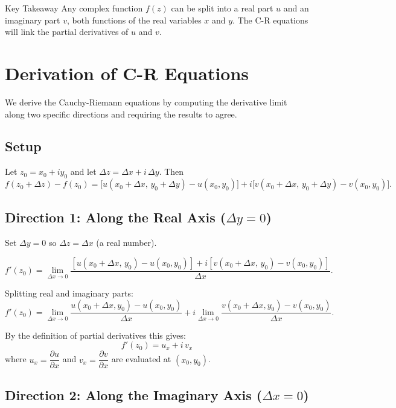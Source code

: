 \documentclass[12pt,a4paper]{article}
\begin{document}
\begin{learnbox}{Key Takeaway}
Any complex function $f(z)$ can be split into a real part $u$ and an imaginary part $v$, both functions of the real variables $x$ and $y$. The C-R equations will link the partial derivatives of $u$ and $v$.
\end{learnbox}

\section{Derivation of C-R Equations}

We derive the Cauchy-Riemann equations by computing the derivative limit along two specific directions and requiring the results to agree.

\subsection*{Setup}

Let $z_0 = x_0 + iy_0$ and let $\Delta z = \Delta x + i\,\Delta y$.
Then
\[
  f(z_0+\Delta z) - f(z_0)
  = \bigl[u(x_0+\Delta x,\,y_0+\Delta y) - u(x_0,y_0)\bigr]
  + i\bigl[v(x_0+\Delta x,\,y_0+\Delta y) - v(x_0,y_0)\bigr].
\]

\subsection*{Direction 1: Along the Real Axis ($\Delta y = 0$)}

Set $\Delta y = 0$ so $\Delta z = \Delta x$ (a real number).

\[
  f'(z_0) = \lim_{\Delta x \to 0}
  \frac{[u(x_0+\Delta x,\,y_0) - u(x_0,y_0)] + i[v(x_0+\Delta x,\,y_0) - v(x_0,y_0)]}{\Delta x}.
\]

Splitting real and imaginary parts:
\[
  f'(z_0) = \lim_{\Delta x \to 0} \frac{u(x_0+\Delta x,y_0) - u(x_0,y_0)}{\Delta x}
           + i\lim_{\Delta x \to 0} \frac{v(x_0+\Delta x,y_0) - v(x_0,y_0)}{\Delta x}.
\]

By the definition of partial derivatives this gives:
\[
  \boxed{f'(z_0) = u_x + i\,v_x} \tag{A}
\]
where $u_x = \dfrac{\partial u}{\partial x}$ and $v_x = \dfrac{\partial v}{\partial x}$ are evaluated at $(x_0,y_0)$.

\subsection*{Direction 2: Along the Imaginary Axis ($\Delta x = 0$)}
\end{document}
